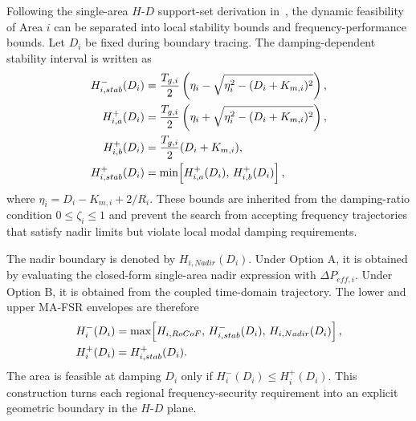 \documentclass[lettersize,journal]{IEEEtran}
\begin{document}
Following the single-area $H$-$D$ support-set derivation in~\cite{manuscript}, the dynamic feasibility of Area $i$ can be separated into local stability bounds and frequency-performance bounds. Let $D_i$ be fixed during boundary tracing. The damping-dependent stability interval is written as
\vspace{-0.15cm}
\begin{subequations}
\begin{align}
H_{i,stab}^{-}(D_i) &=
\frac{T_{g,i}}{2}\left(\eta_i-\sqrt{\eta_i^2-(D_i+K_{m,i})^2}\right),\\
H_{i,a}^{+}(D_i) &=
\frac{T_{g,i}}{2}\left(\eta_i+\sqrt{\eta_i^2-(D_i+K_{m,i})^2}\right),\\
H_{i,b}^{+}(D_i) &= \frac{T_{g,i}}{2}(D_i+K_{m,i}),\\
H_{i,stab}^{+}(D_i) &= \min\!\left[H_{i,a}^{+}(D_i),\,H_{i,b}^{+}(D_i)\right],
\end{align}
\vspace{-0.15cm}
\label{eq:stab_bounds}
\end{subequations}
where $\eta_i = D_i-K_{m,i}+2/R_i$. These bounds are inherited from the damping-ratio condition $0 \leq \zeta_i \leq 1$ and prevent the search from accepting frequency trajectories that satisfy nadir limits but violate local modal damping requirements.

The nadir boundary is denoted by $H_{i,Nadir}(D_i)$. Under Option A, it is obtained by evaluating the closed-form single-area nadir expression with $\Delta P_{eff,i}$. Under Option B, it is obtained from the coupled time-domain trajectory. The lower and upper MA-FSR envelopes are therefore
\vspace{-0.15cm}
\begin{subequations}
\begin{align}
H_i^{-}(D_i) &= \max\!\left[
H_{i,RoCoF},\, H_{i,stab}^{-}(D_i),\, H_{i,Nadir}(D_i)
\right],\\
H_i^{+}(D_i) &= H_{i,stab}^{+}(D_i).
\end{align}
\vspace{-0.15cm}
\label{eq:mafsr_envelope}
\end{subequations}
The area is feasible at damping $D_i$ only if $H_i^{-}(D_i) \leq H_i^{+}(D_i)$. This construction turns each regional frequency-security requirement into an explicit geometric boundary in the $H$-$D$ plane.
\end{document}
